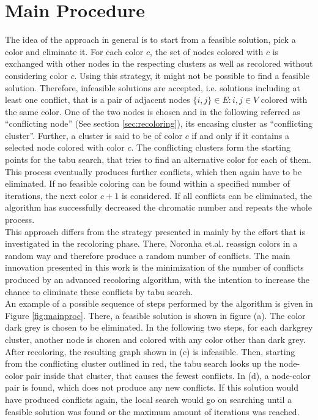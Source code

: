 \section{Main Procedure}
\label{sec:mainalg}
The idea of the approach in general is to start from a feasible solution, pick a color and eliminate it. For each color $c$, the set of nodes colored with $c$ is exchanged with other nodes in the respecting clusters as well as recolored without considering color $c$. Using this strategy, it might not be possible to find a feasible solution. Therefore, infeasible solutions are accepted, i.e. solutions including at least one conflict, that is a pair of adjacent nodes $\{i,j\}\in E : i,j \in V$ colored with the same color. One of the two nodes is chosen and in the following referred as ``conflicting node'' (See section \ref{sec:recoloring}), its encasing cluster as ``conflicting cluster''. Further, a cluster is said to be of color $c$ if and only if it contains a selected node colored with color $c$. The conflicting clusters form the starting points for the tabu search, that tries to find an alternative color for each of them. This process eventually produces further conflicts, which then again have to be eliminated. If no feasible coloring can be found within a specified number of iterations, the next color $c+1$ is considered. If all conflicts can be eliminated, the algorithm has successfully decreased the chromatic number and repeats the whole process.\\
This approach differs from the strategy presented in \cite{noronha-06} mainly by the effort that is investigated in the recoloring phase. There, Noronha et.al. reassign colors in a random way and therefore produce a random number of conflicts. The main innovation presented in this work is the minimization of the number of conflicts produced by an advanced recoloring algorithm, with the intention to increase the chance to eliminate these conflicts by tabu search.\\
An example of a possible sequence of steps performed by the algorithm is given in Figure \ref{fig:mainproc}. There, a feasible solution is shown in figure (a). The color dark grey is chosen to be eliminated. In the following two steps, for each darkgrey cluster, another node is chosen and colored with any color other than dark grey. After recoloring, the resulting graph shown in (c) is infeasible. Then, starting from the conflicting cluster outlined in red, the tabu search looks up the node-color pair inside that cluster, that causes the fewest conflicts. In (d), a node-color pair is found, which does not produce any new conflicts. If this solution would have produced conflicts again, the local search would go on searching until a feasible solution was found or the maximum amount of iterations was reached.
